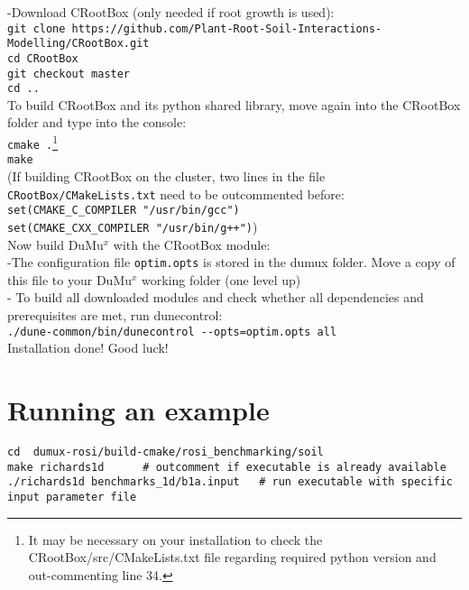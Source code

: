 -Download CRootBox (only needed if root growth is used):\\
\texttt{git clone https://github.com/Plant-Root-Soil-Interactions-Modelling/CRootBox.git}\\
    \hspace{\parindent} \texttt{cd CRootBox}\\
    \hspace{\parindent} \texttt{git checkout master}\\
		\hspace{\parindent} \texttt{cd ..}\\
To build CRootBox and its python shared library, move again into the CRootBox folder and type into the console:\\
\lstinline{cmake .}\footnote{It may be necessary on your installation to check the CRootBox/src/CMakeLists.txt file regarding required python version and out-commenting line 34.}\\
\lstinline{make}\\
(If building CRootBox on the cluster, two lines in the file \lstinline{CRootBox/CMakeLists.txt} need to be outcommented before:\\ 
\lstinline{set(CMAKE_C_COMPILER "/usr/bin/gcc")}\\
\lstinline{set(CMAKE_CXX_COMPILER "/usr/bin/g++")})\\

Now build DuMu$^{x}$ with the CRootBox module: \\
-The configuration file \lstinline{optim.opts} is stored in the dumux folder. Move a copy of this file to your DuMu$^x$ working folder (one level up)\\

- To build all downloaded modules and check whether all dependencies and prerequisites are met, run dunecontrol:\\
\lstinline{./dune-common/bin/dunecontrol --opts=optim.opts all}\\

Installation done! Good luck!

\section*{Running an example}

\begin{lstlisting}
cd  dumux-rosi/build-cmake/rosi_benchmarking/soil
make richards1d      # outcomment if executable is already available
./richards1d benchmarks_1d/b1a.input   # run executable with specific input parameter file
\end{lstlisting}

